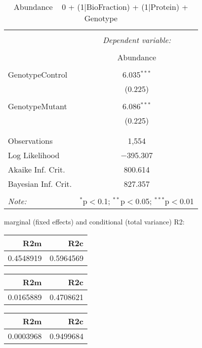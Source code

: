 \documentclass[11pt]{report}
\begin{document}
\begin{table}[!htbp] \centering 
  \caption{Abundance ~ 0 + (1|BioFraction) + (1|Protein) + Genotype} 
  \label{} 
\begin{tabular}{@{\extracolsep{5pt}}lc} 
\\[-1.8ex]\hline 
\hline \\[-1.8ex] 
 & \multicolumn{1}{c}{\textit{Dependent variable:}} \\ 
\cline{2-2} 
\\[-1.8ex] & Abundance \\ 
\hline \\[-1.8ex] 
 GenotypeControl & 6.035$^{***}$ \\ 
  & (0.225) \\ 
  & \\ 
 GenotypeMutant & 6.086$^{***}$ \\ 
  & (0.225) \\ 
  & \\ 
\hline \\[-1.8ex] 
Observations & 1,554 \\ 
Log Likelihood & $-$395.307 \\ 
Akaike Inf. Crit. & 800.614 \\ 
Bayesian Inf. Crit. & 827.357 \\ 
\hline 
\hline \\[-1.8ex] 
\textit{Note:}  & \multicolumn{1}{r}{$^{*}$p$<$0.1; $^{**}$p$<$0.05; $^{***}$p$<$0.01} \\ 
\end{tabular} 
\end{table} 
marginal (fixed effects) and conditional (total variance) R2:

\begin{tabular}{r|r}
\hline
R2m & R2c\\
\hline
0.4548919 & 0.5964569\\
\hline
\end{tabular}

\begin{tabular}{r|r}
\hline
R2m & R2c\\
\hline
0.0165889 & 0.4708621\\
\hline
\end{tabular}

\begin{tabular}{r|r}
\hline
R2m & R2c\\
\hline
0.0003968 & 0.9499684\\
\hline
\end{tabular}
\end{document}
